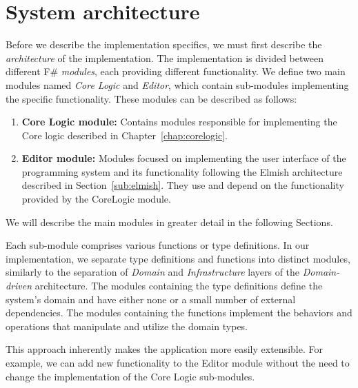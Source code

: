\section{System architecture}
\label{sec:appArch}
Before we describe the implementation specifics, we must first describe the \emph{architecture} of the implementation.
The implementation is divided between different F\# \emph{modules}, each providing different functionality.
We define two main modules named \emph{Core Logic} and \emph{Editor}, which contain sub-modules implementing the specific functionality.
These modules can be described as follows:
\begin{enumerate}
	\item \textbf{Core Logic module:} Contains modules responsible for implementing the Core logic described in Chapter~\ref{chap:corelogic}.
	\item \textbf{Editor module:} Modules focused on implementing the user interface of the programming system and its functionality following the Elmish architecture described in Section~\ref{sub:elmish}.
	      They use and depend on the functionality provided by the CoreLogic module.
\end{enumerate}
We will describe the main modules in greater detail in the following Sections.

Each sub-module comprises various functions or type definitions.
In our implementation, we separate type definitions and functions into distinct modules, similarly to the separation of \emph{Domain} and \emph{Infrastructure} layers of the \emph{Domain-driven} architecture.
The modules containing the type definitions define the system's domain and have either none or a small number of external dependencies.
The modules containing the functions implement the behaviors and operations that manipulate and utilize the domain types.

This approach inherently makes the application more easily extensible.
For example, we can add new functionality to the Editor module without the need to change the implementation of the Core Logic sub-modules.

